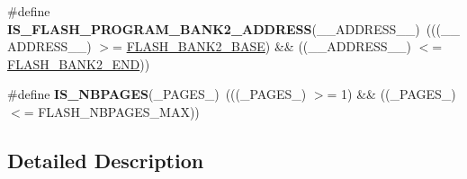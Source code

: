 \begin{DoxyCompactItemize}
\item 
\hypertarget{group___f_l_a_s_h_ex___address_gac2786435e0972a95162196eb7120f1e8}{\#define {\bfseries I\-S\-\_\-\-F\-L\-A\-S\-H\-\_\-\-P\-R\-O\-G\-R\-A\-M\-\_\-\-B\-A\-N\-K2\-\_\-\-A\-D\-D\-R\-E\-S\-S}(\-\_\-\-\_\-\-A\-D\-D\-R\-E\-S\-S\-\_\-\-\_\-)~(((\-\_\-\-\_\-\-A\-D\-D\-R\-E\-S\-S\-\_\-\-\_\-) $>$= \hyperlink{group___peripheral__memory__map_ga289057b052162696849fef25b656d3d9}{F\-L\-A\-S\-H\-\_\-\-B\-A\-N\-K2\-\_\-\-B\-A\-S\-E}) \&\& ((\-\_\-\-\_\-\-A\-D\-D\-R\-E\-S\-S\-\_\-\-\_\-) $<$= \hyperlink{group___peripheral__memory__map_gab24a21b645aaab8737af5603c3d11e71}{F\-L\-A\-S\-H\-\_\-\-B\-A\-N\-K2\-\_\-\-E\-N\-D}))}\label{group___f_l_a_s_h_ex___address_gac2786435e0972a95162196eb7120f1e8}

\item 
\hypertarget{group___f_l_a_s_h_ex___address_ga7c2783a394d7f076ada3b629ac352b22}{\#define {\bfseries I\-S\-\_\-\-N\-B\-P\-A\-G\-E\-S}(\-\_\-\-P\-A\-G\-E\-S\-\_\-)~(((\-\_\-\-P\-A\-G\-E\-S\-\_\-) $>$= 1) \&\& ((\-\_\-\-P\-A\-G\-E\-S\-\_\-) $<$= F\-L\-A\-S\-H\-\_\-\-N\-B\-P\-A\-G\-E\-S\-\_\-\-M\-A\-X))}\label{group___f_l_a_s_h_ex___address_ga7c2783a394d7f076ada3b629ac352b22}

\end{DoxyCompactItemize}


\subsection{Detailed Description}
